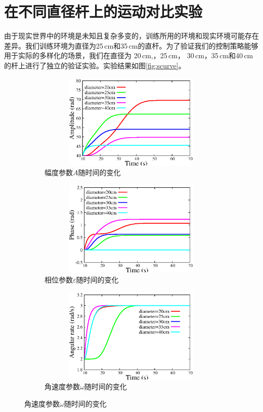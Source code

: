 \section{在不同直径杆上的运动对比实验}

由于现实世界中的环境是未知且复杂多变的，训练所用的环境和现实环境可能存在差异。我们训练环境为直径为25\,cm和35\,cm的直杆。为了验证我们的控制策略能够用于实际的多样化的场景，我们在直径为 20\,cm,，25\,cm， 30\,cm，35\,cm和40\,cm的杆上进行了独立的验证实验。实验结果如图\ref{fig:scurve}。

\begin{figure}[htbp]
	\centering
	\begin{subfigure}{0.45\textwidth}{
			\centering
			\includegraphics[width=1\textwidth,height=130pt]{figure/chap05/samplifier.eps}
			\caption{幅度参数$A$随时间的变化}
			\label{fig:samplifier}
		}
	\end{subfigure}
	\begin{subfigure}{0.45\textwidth}{
			\centering
			\includegraphics[width=1\textwidth,height=130pt]{figure/chap05/sphase.eps}
			\caption{相位参数$\varepsilon$随时间的变化}
			\label{fig:sphase}
		}
	\end{subfigure}
	\begin{subfigure}{0.45\textwidth}{
			\centering
			\includegraphics[width=1\textwidth,height=130pt]{figure/chap05/sarate.eps}	
			\caption{角速度参数$\omega$随时间的变化}
			\label{fig:sarate}
		}

\end{subfigure}
\end{figure}
